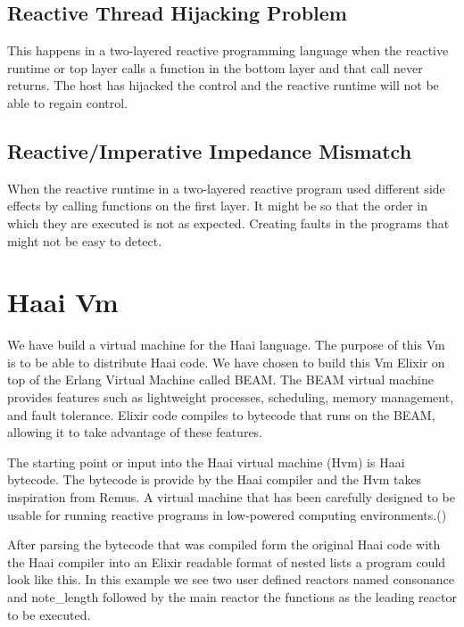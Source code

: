 \documentclass[a4paper]{book}
\begin{document}
\section*{Reactive Thread Hijacking Problem}
This happens in a two-layered reactive programming language when the reactive runtime or top layer calls a function in the bottom layer and that call never returns. The host has hijacked the control and the reactive runtime will not be able to regain control.  

\section*{Reactive/Imperative Impedance Mismatch}
When the reactive runtime in a two-layered reactive program used different side effects by calling functions on the first layer. It might be so that the order in which they are executed is not as expected. Creating faults in the programs that might not be easy to detect.

\chapter{Haai Vm}
We have build a virtual machine for the Haai language. The purpose of this Vm is to be able to distribute Haai code. We have chosen to build this Vm Elixir on top of the Erlang Virtual Machine called BEAM. The BEAM virtual machine provides features such as lightweight processes, scheduling, memory management, and fault tolerance. Elixir code compiles to bytecode that runs on the BEAM, allowing it to take advantage of these features.

The starting point or input into the Haai virtual machine (Hvm) is Haai bytecode. The bytecode is provide by the Haai compiler and the Hvm takes inspiration from Remus. A virtual machine that has been carefully designed to be usable for running reactive programs in low-powered computing environments.(\cite{oeyen_remus_2022})

After parsing the bytecode that was compiled form the original Haai code with the Haai compiler into an Elixir readable format of nested lists a program could look like this. In this example we see two user defined reactors named consonance and note\_length followed by the main reactor the functions as the leading reactor to be executed.
\end{document}
